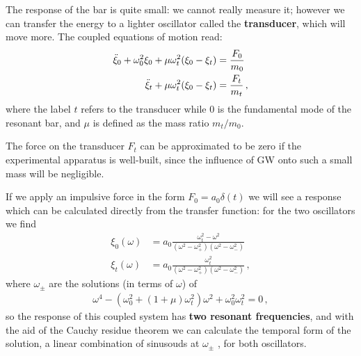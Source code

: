\documentclass[main.tex]{subfiles}
\begin{document}
The response of the bar is quite small: we cannot really measure it; however we can transfer the energy to a lighter oscillator called the \textbf{transducer}, which will move more. 
The coupled equations of motion read: 
%
\begin{align}
\ddot{\xi}_{0} + \omega_0^2 \xi_0 + \mu \omega_{t}^2 \qty(\xi_0 - \xi_t)
&= \frac{F_0}{m_0 }  \\
\ddot{\xi}_{t} + \mu \omega_{t}^2 \qty(\xi_0 - \xi_t) &= \frac{F_t}{m_t}
\,,
\end{align}
%
where the label \(t\) refers to the transducer while \(0\) is the fundamental mode of the resonant bar, and \(\mu \) is defined as the mass ratio \(m_t / m_0\). 

The force on the transducer \(F_t\) can be approximated to be zero if the experimental apparatus is well-built, since the influence of GW onto such a small mass will be negligible.

If we apply an impulsive force in the form \(F_0 = a_0 \delta (t)\) we will see a response which can be calculated directly from the transfer function: for the two oscillators we find 
%
\begin{align}
\xi_0 (\omega ) &= a_0 \frac{\omega_{t}^2 - \omega^2}{(\omega^2 - \omega^2_{+} ) (\omega^2- \omega^2_{-})}  \\
\xi_{t} (\omega ) &= a_0 \frac{\omega_{t}^2}{(\omega^2 - \omega^2_{+}) (\omega^2- \omega^2_{-})}
\,,
\end{align}
%
where \(\omega_{\pm}\) are the solutions (in terms of \(\omega \)) of 
%
\begin{align}
\omega^4 - (\omega^2_{0} + (1+\mu )\omega_{t}^2) \omega^2 + \omega_0^2 \omega_t^2 = 0
\,,
\end{align}
%
so the response of this coupled system has \textbf{two resonant frequencies}, and with the aid of the Cauchy residue theorem we can calculate the temporal form of the solution, a linear combination of sinusouds at \(\omega_{\pm}\) \cite[eqs.\ 8.79--80]{maggioreGravitationalWavesVolume2007}, for both oscillators.
\end{document}
